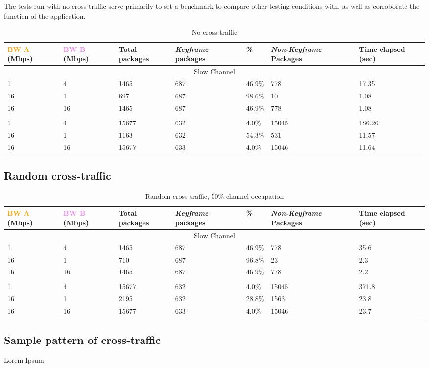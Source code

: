 The tests run with no cross-traffic serve primarily to set a benchmark to compare other testing conditions with, as well as corroborate the function of the application. 

\begin{table}[htbp]
\caption{No cross-traffic}
\break
\setlength{\arrayrulewidth}{1mm}
\setlength{\tabcolsep}{12pt}
\renewcommand{\arraystretch}{1.5}
 {
\begin{tabular}{ |p{1.375cm}|p{1.375cm}|p{1.5cm}|p{1.5cm}|p{1cm}|p{1.75cm}|p{1.75cm}| }
\hline
\textcolor{orange}{BW A} (Mbps)&\textcolor{violet}{BW B} (Mbps)& Total packages & \textit{Keyframe} packages & \% & \textit{Non-Keyframe} Packages & Time elapsed (sec) \\
\hline
\multicolumn{7}{|c|}{Slow Channel} \\
\hline
1&4&1465&687&46.9\%&778&17.35\\
16&1&697&687&98.6\%&10&1.08\\
16&16&1465&687&46.9\%&778&1.08\\
\hline
\rowcolor{white}\multicolumn{7}{|c|}{Medium Channel} \\
\hline
1&4&15677&632&4.0\%&15045&186.26\\
16&1&1163&632&54.3\%&531&11.57\\
16&16&15677&633&4.0\%&15046&11.64\\
\hline
\end{tabular}
}
\end{table}


\subsection{Random cross-traffic}

\begin{table}[htbp]
\caption{Random cross-traffic, 50\% channel occupation}
\break
\setlength{\arrayrulewidth}{1mm}
\setlength{\tabcolsep}{12pt}
\renewcommand{\arraystretch}{1.5}
 {
\begin{tabular}{ |p{1.375cm}|p{1.375cm}|p{1.5cm}|p{1.5cm}|p{1cm}|p{1.75cm}|p{1.75cm}| }
\hline
\textcolor{orange}{BW A} (Mbps)&\textcolor{violet}{BW B} (Mbps)& Total packages & \textit{Keyframe} packages & \% & \textit{Non-Keyframe} Packages & Time elapsed (sec) \\
\hline
\multicolumn{7}{|c|}{Slow Channel} \\
\hline
1&4&1465&687&46.9\%&778&35.6\\
16&1&710&687&96.8\%&23&2.3\\
16&16&1465&687&46.9\%&778&2.2\\
\hline
\rowcolor{white}\multicolumn{7}{|c|}{Medium Channel} \\
\hline
1&4&15677&632&4.0\%&15045&371.8\\
16&1&2195&632&28.8\%&1563&23.8\\
16&16&15677&633&4.0\%&15046&23.7\\
\hline
\end{tabular}
}
\end{table}

\subsection{Sample pattern of cross-traffic}

Lorem Ipsum
